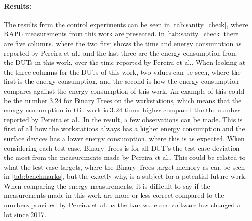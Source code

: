 \paragraph*{Results:} The results from the control experiments can be seen in \cref{tab:sanity_check}, where RAPL measurements from this work are presented. In \cref{tab:sanity_check} there are five columns, where the two first shows the time and energy consumption as reported by Pereira et al.\cite[]{Pereira2017}, and the last three are the energy consumption from the DUTs in this work, over the time reported by Pereira et al.\cite[]{Pereira2017}. When looking at the three columns for the DUTs of this work, two values can be seen, where the first is the energy consumption, and the second is how the energy consumption compares against the energy consumption of this work. An example of this could be the number $3.24$ for Binary Trees on the workstations, which means that the energy consumption in this work is $3.24$ times higher compared the the number reported by Pereira et al.\cite[]{Pereira2017}. In the result, a few observations can be made. This is first of all how the workstations always has a higher energy consumption and the surface devices has a lower energy consumption, where this is as expected. When considering each test case, Binary Trees is for all DUT's the test case deviation the most from the measurements made by Pereira et al.\cite[]{Pereira2017}. This could be related to what the test case targets, where the Binary Trees target memory as can be seen in \cref{tab:benchmarks}, but the exactly why, is a subject for a potential future work. When comparing the energy measurements, it is difficult to say if the measurements made in this work are more or less correct compared to the numbers provided by Pereira et al.\cite[]{Pereira2017} as the hardware and software has changed a lot since 2017.